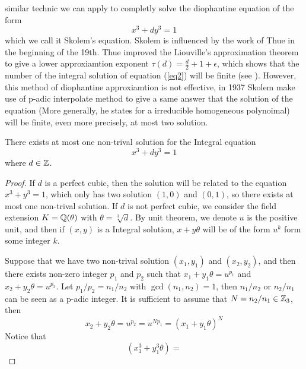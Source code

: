     similar technic we can apply to completly solve the diophantine equation of the form
    \begin{equation} \label{eq2}
        x^3+dy^3=1
    \end{equation}
    which we call it Skolem's equation. Skolem is influenced by the work of Thue in the beginning of the 19th. Thue improved the Liouville's approximation theorem to give a lower approxiamtion exponent \(\tau(d) = \frac{d}{2}+1+\epsilon\), which shows that the number of the integral solution of equation (\ref{eq2}) will be finite (see \cite[Chapter 11]{silverman2009arithmetic}). However, this method of diophantine approxiamtion is not effective, in 1937 Skolem make use of p-adic interpolate method to give a same answer that the solution of the equation (More generally, he states for a irreducible homogeneous polynoimal) will be finite, even more precisely, at most two solution.

    
    \begin{theorem}[Skolem] There exists at most one non-trival solution for the Integral equation
        \[x^3+dy^3=1\]
    where \(d \in \mathbb{Z}\).
        \begin{proof}
            If \(d\) is a perfect cubic, then the solution will be related to the equation \(x^3+y^3=1\), which only has two solution \((1,0)\) and \((0,1)\), so there exists at most one non-trival solution. If \(d\) is not perfect cubic, we consider the field extension \(K = \mathbb{Q}(\theta)\) with \(\theta = \sqrt[3]{d}\). By unit theorem, we denote \(u\) is the positive unit, and then if \((x,y)\) is a Integral solution, \(x+y\theta\) will be of the form \(u^k\) form some integer \(k\).

            Suppose that we have two non-trival solution \((x_1,y_1)\) and \((x_2,y_2)\), and then there exists non-zero integer \(p_1\) and \(p_2\) such that \(x_1+y_1\theta = u^{p_1}\) and \(x_2+y_2\theta = u^{p_2}\). Let \(p_1/p_2 = n_1/n_2\) with \(\gcd(n_1,n_2)=1\), then \(n_1/n_2\) or \(n_2/n_1\) can be seen as a p-adic integer. It is sufficient to assume that \(N = n_2/n_1 \in \mathbb{Z}_3\), then 
            \[x_2+y_2\theta = u^{p_2} = u^{Np_1} = (x_1+y_1\theta)^N\]
            Notice that \[(x_1^3+y_1^3\theta) = \]
        \end{proof}
    \end{theorem}




